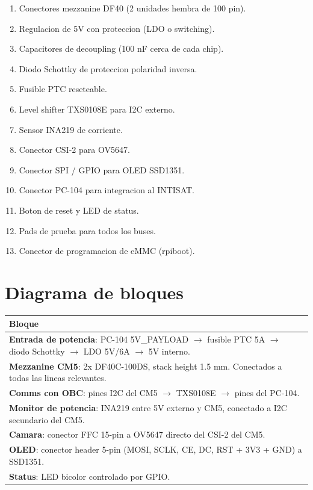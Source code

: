 \documentclass[11pt,a4paper,oneside,openright]{book}
\begin{document}
\begin{enumerate}[leftmargin=2em]
  \item Conectores mezzanine DF40 (2 unidades hembra de 100 pin).
  \item Regulacion de 5V con proteccion (LDO o switching).
  \item Capacitores de decoupling (100 nF cerca de cada chip).
  \item Diodo Schottky de proteccion polaridad inversa.
  \item Fusible PTC reseteable.
  \item Level shifter TXS0108E para I2C externo.
  \item Sensor INA219 de corriente.
  \item Conector CSI-2 para OV5647.
  \item Conector SPI / GPIO para OLED SSD1351.
  \item Conector PC-104 para integracion al INTISAT.
  \item Boton de reset y LED de status.
  \item Pads de prueba para todos los buses.
  \item Conector de programacion de eMMC (rpiboot).
\end{enumerate}

\section{Diagrama de bloques}

\begin{center}
\begin{tabular}{|p{14cm}|}
\hline
\textbf{Bloque} \\
\hline
\textbf{Entrada de potencia}: PC-104 5V\_PAYLOAD $\to$ fusible PTC 5A $\to$
diodo Schottky $\to$ LDO 5V/6A $\to$ 5V interno. \\
\hline
\textbf{Mezzanine CM5}: 2x DF40C-100DS, stack height 1.5 mm. Conectados a
todas las lineas relevantes. \\
\hline
\textbf{Comms con OBC}: pines I2C del CM5 $\to$ TXS0108E $\to$ pines del PC-104. \\
\hline
\textbf{Monitor de potencia}: INA219 entre 5V externo y CM5, conectado a
I2C secundario del CM5. \\
\hline
\textbf{Camara}: conector FFC 15-pin a OV5647 directo del CSI-2 del CM5. \\
\hline
\textbf{OLED}: conector header 5-pin (MOSI, SCLK, CE, DC, RST + 3V3 + GND)
a SSD1351. \\
\hline
\textbf{Status}: LED bicolor controlado por GPIO. \\
\hline
\end{tabular}
\end{center}
\end{document}
